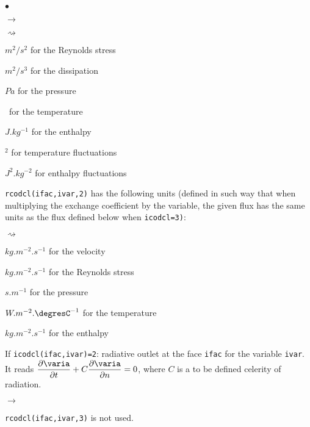 {{{\begin{list}{$\bullet$}{}
\begin{list}{$\rightarrow$}{}
\begin{list}{$\rightsquigarrow$}{}
\item $m^2/s^2$ for the Reynolds stress

\item $m^2/s^3$ for the dissipation

\item $Pa$ for the pressure

\item \degresC\ for the temperature

\item $J.kg^{-1}$ for the enthalpy

\item \degresC$^2$ for temperature fluctuations

\item $J^2.kg^{-2}$ for enthalpy fluctuations
\end{list}

\item \texttt{rcodcl(ifac,ivar,2)} has the following units (defined in such way that when multiplying the exchange coefficient by the variable, the
      given flux has the same units as the flux defined below when
      \texttt{icodcl=3)}:

\begin{list}{$\rightsquigarrow$}{}
\item $kg.m^{-2}.s^{-1}$ for the velocity

\item $kg.m^{-2}.s^{-1}$ for the Reynolds stress

\item $s.m^{-1}$ for the pressure

\item $W.m^{-2}.\mbox{\degresC}^{-1}$ for the temperature

\item $kg.m^{-2}.s^{-1}$ for the enthalpy
\end{list}

\end{list}

\item If \texttt{icodcl(ifac,ivar)=2}: radiative outlet at the face \texttt{ifac}
      for the variable \texttt{ivar}. It reads $ \dfrac{\partial \varia }{\partial t} + C \dfrac{\partial \varia}{\partial n} = 0 $, where $C$ is a to be defined celerity of radiation.

\begin{list}{$\rightarrow$}{}
\item \texttt{rcodcl(ifac,ivar,3)} is not used.


\end{list}
\end{list}}}}
